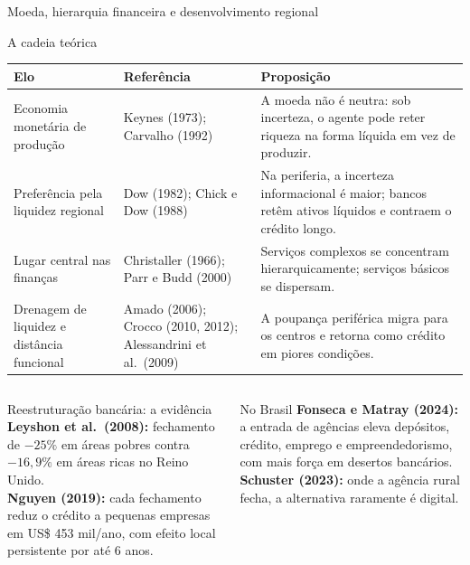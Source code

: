\documentclass[aspectratio=169,10pt]{beamer}
\begin{document}
\begin{frame}{Moeda, hierarquia financeira e desenvolvimento regional}
  \begin{block}{A cadeia teórica}
    \scriptsize
    \begin{tabular}{@{}P{0.20\textwidth}P{0.24\textwidth}P{0.46\textwidth}@{}}
      \toprule
      \textbf{Elo} & \textbf{Referência} & \textbf{Proposição} \\
      \midrule
      Economia monetária de produção &
        \small Keynes (1973); Carvalho (1992) &
        A moeda não é neutra: sob incerteza, o agente pode reter riqueza na forma
        líquida em vez de produzir.\\[0.35em]
      Preferência pela liquidez regional &
        \small Dow (1982); Chick e Dow (1988) &
        Na periferia, a incerteza informacional é maior; bancos retêm ativos
        líquidos e contraem o crédito longo.\\[0.35em]
      Lugar central nas finanças &
        \small Christaller (1966); Parr e Budd (2000) &
        Serviços complexos se concentram hierarquicamente; serviços básicos se
        dispersam.\\[0.35em]
      Drenagem de liquidez e distância funcional &
        \small Amado (2006); Crocco (2010, 2012); Alessandrini et al.\ (2009) &
        A poupança periférica migra para os centros e retorna como crédito em
        piores condições.\\
      \bottomrule
    \end{tabular}
  \end{block}

  \vspace{-0.2em}
  \begin{columns}[T]
    \begin{column}{0.49\textwidth}
      \begin{exampleblock}{Reestruturação bancária: a evidência}
        \scriptsize
        \textbf{Leyshon et al.\ (2008):} fechamento de $-25\%$ em áreas pobres
        contra $-16{,}9\%$ em áreas ricas no Reino Unido.\\
        \textbf{Nguyen (2019):} cada fechamento reduz o crédito a pequenas
        empresas em US\$ 453 mil/ano, com efeito local persistente por até 6 anos.
      \end{exampleblock}
    \end{column}
    \begin{column}{0.49\textwidth}
      \begin{exampleblock}{No Brasil}
        \scriptsize
        \textbf{Fonseca e Matray (2024):} a entrada de agências eleva depósitos,
        crédito, emprego e empreendedorismo, com mais força em desertos bancários.\\
        \textbf{Schuster (2023):} onde a agência rural fecha, a alternativa
        raramente é digital.
      \end{exampleblock}
    \end{column}
  \end{columns}
\end{frame}
\end{document}

